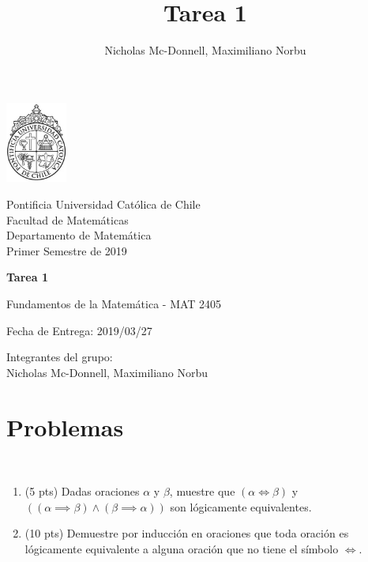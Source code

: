 

\title{Tarea 1}
\author{Nicholas Mc-Donnell, Maximiliano Norbu}


\begin{minipage}{2.5cm}
    \includegraphics[width=2cm]{../../figures/logo1.jpg}
\end{minipage}
\begin{minipage}{13cm}
    \begin{flushleft}
        \raggedright
        {
            \noindent
            {\sc Pontificia Universidad Católica de Chile\\
                Facultad de Matemáticas\\
                Departamento de Matemática} \smallskip \\
            Primer Semestre de 2019\\
        }
    \end{flushleft}
\end{minipage}

\vspace{2ex}
{\Large \centerline{\bf Tarea 1}}
{\large \centerline{Fundamentos de la Matemática - MAT 2405}}
\centerline{Fecha de Entrega: 2019/03/27}

\begin{flushright}
    Integrantes del grupo:\\
    Nicholas Mc-Donnell, Maximiliano Norbu
\end{flushright}

\section*{Problemas}

\begin{prob}[15 pts]
    \
    \begin{enumerate}[label=(\alph*)]
        \item (5 pts) Dadas oraciones $\alpha$ y $\beta$, muestre que $(\alpha \iff \beta)$ y $((\alpha \implies \beta) \wedge (\beta \implies \alpha))$ son lógicamente equivalentes.
        \item (10 pts) Demuestre por inducción en oraciones que toda oración es lógicamente equivalente a alguna oración que no tiene el símbolo $\iff$.
    \end{enumerate}
\end{prob}

